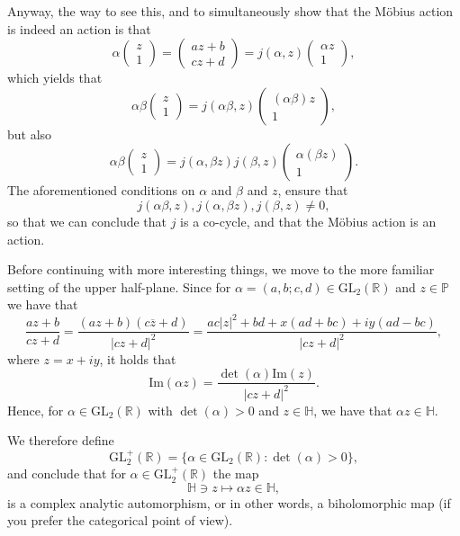 \documentclass{article}
\theoremstyle{definition}
\begin{document}
Anyway, the way to see this, and to simultaneously show that the Möbius action is indeed an action is that
\[\alpha\begin{pmatrix}z\\1\end{pmatrix}=\begin{pmatrix}az+b\\cz+d\end{pmatrix}=j(\alpha,z)\begin{pmatrix}\alpha z\\1\end{pmatrix},\]
which yields that
\[\alpha\beta\begin{pmatrix}z\\1\end{pmatrix}=j(\alpha\beta,z)\begin{pmatrix}(\alpha\beta)z\\1\end{pmatrix},\]
but also
\[\alpha\beta\begin{pmatrix}z\\1\end{pmatrix}=j(\alpha,\beta z)j(\beta, z)\begin{pmatrix}\alpha(\beta z)\\1\end{pmatrix}.\]
The aforementioned conditions on $\alpha$ and $\beta$ and $z$, ensure that
\[j(\alpha\beta,z),j(\alpha,\beta z),j(\beta,z)\neq 0,\]
so that we can conclude that $j$ is a co-cycle, and that the Möbius action is an action.

Before continuing with more interesting things, we move to the more familiar setting of the upper half-plane. Since for $\alpha=(a,b;c,d)\in\mathrm{GL}_2(\mathbb{R})$ and $z\in\mathbb{P}$ we have that
\[\frac{az+b}{cz+d}=\frac{(az+b)(c\overline{z}+d)}{|cz+d|^2}=\frac{ac|z|^2+bd+x(ad+bc)+iy(ad-bc)}{|cz+d|^2},\]
where $z=x+iy$, it holds that
\[\mathrm{Im}(\alpha z)=\frac{\det(\alpha)\mathrm{Im}(z)}{|cz+d|^2}.\]
Hence, for $\alpha\in\mathrm{GL}_2(\mathbb{R})$ with $\det(\alpha)>0$ and $z\in\mathbb{H}$, we have that $\alpha z\in\mathbb{H}$.

We therefore define
\[\mathrm{GL}_2^+(\mathbb{R})=\{\alpha\in\mathrm{GL}_2(\mathbb{R}):\det(\alpha)>0\},\]
and conclude that for $\alpha\in\mathrm{GL}_2^+(\mathbb{R})$ the map
\[\mathbb{H}\ni z\mapsto\alpha z\in\mathbb{H},\]
is a complex analytic automorphism, or in other words, a biholomorphic map (if you prefer the categorical point of view).
\end{document}
